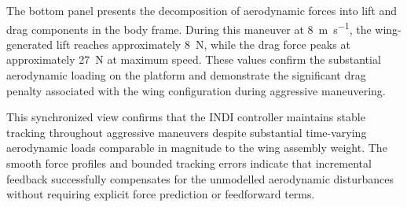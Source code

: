 The bottom panel presents the decomposition of aerodynamic forces into lift and drag components in the body frame.
During this maneuver at \SI{8}{\meter\per\second}, the wing-generated lift reaches approximately \SI{8}{\newton}, while the drag force peaks at approximately \SI{27}{\newton} at maximum speed.
These values confirm the substantial aerodynamic loading on the platform and demonstrate the significant drag penalty associated with the wing configuration during aggressive maneuvering.

This synchronized view confirms that the INDI controller maintains stable tracking throughout aggressive maneuvers despite substantial time-varying aerodynamic loads comparable in magnitude to the wing assembly weight.
The smooth force profiles and bounded tracking errors indicate that incremental feedback successfully compensates for the unmodelled aerodynamic disturbances without requiring explicit force prediction or feedforward terms.

